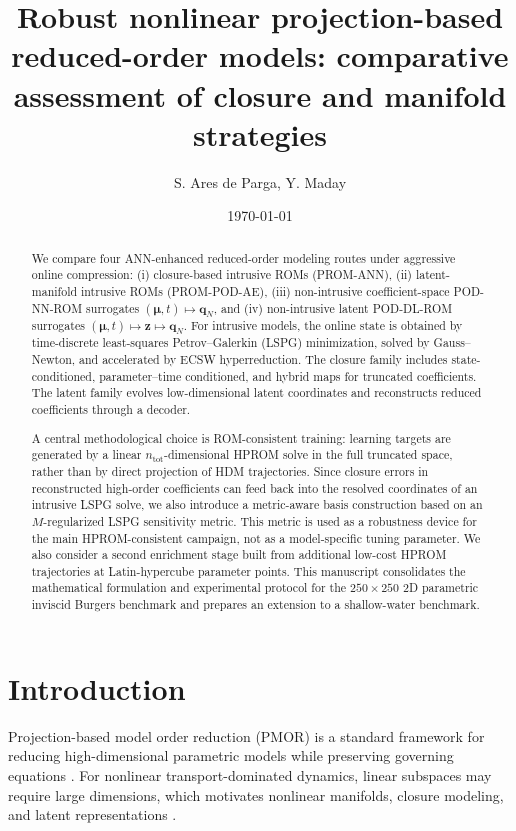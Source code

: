 \documentclass[11pt]{article}
\title{\vspace{-1.5em}
Robust nonlinear projection-based reduced-order models: comparative assessment of closure and manifold strategies}
\author{S. Ares de Parga, Y. Maday}
\date{\today}
\begin{document}
\maketitle
\vspace{-1.0em}

\begin{abstract}
We compare four ANN-enhanced reduced-order modeling routes under aggressive online compression: (i) closure-based intrusive ROMs (PROM-ANN), (ii) latent-manifold intrusive ROMs (PROM-POD-AE), (iii) non-intrusive coefficient-space POD-NN-ROM surrogates $(\bm\mu,t)\mapsto\mathbf q_N$, and (iv) non-intrusive latent POD-DL-ROM surrogates $(\bm\mu,t)\mapsto\mathbf z\mapsto\mathbf q_N$. For intrusive models, the online state is obtained by time-discrete least-squares Petrov--Galerkin (LSPG) minimization, solved by Gauss--Newton, and accelerated by ECSW hyperreduction. The closure family includes state-conditioned, parameter--time conditioned, and hybrid maps for truncated coefficients. The latent family evolves low-dimensional latent coordinates and reconstructs reduced coefficients through a decoder.

A central methodological choice is ROM-consistent training: learning targets are generated by a linear $n_{\mathrm{tot}}$-dimensional HPROM solve in the full truncated space, rather than by direct projection of HDM trajectories. Since closure errors in reconstructed high-order coefficients can feed back into the resolved coordinates of an intrusive LSPG solve, we also introduce a metric-aware basis construction based on an $M$-regularized LSPG sensitivity metric. This metric is used as a robustness device for the main HPROM-consistent campaign, not as a model-specific tuning parameter. We also consider a second enrichment stage built from additional low-cost HPROM trajectories at Latin-hypercube parameter points. This manuscript consolidates the mathematical formulation and experimental protocol for the $250\times250$ 2D parametric inviscid Burgers benchmark and prepares an extension to a shallow-water benchmark.
\end{abstract}

\vspace{-1.0em}

\section{Introduction}
Projection-based model order reduction (PMOR) is a standard framework for reducing high-dimensional parametric models while preserving governing equations \cite{antoulas2005approximation,quarteroni2014reduced}. For nonlinear transport-dominated dynamics, linear subspaces may require large dimensions, which motivates nonlinear manifolds, closure modeling, and latent representations \cite{barnett2023neural,cohen2023nonlinear,aghili2026nonlinear}.
\end{document}

